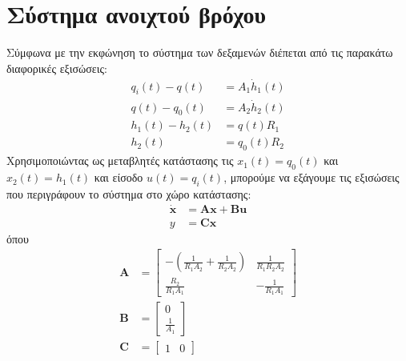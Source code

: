 \documentclass[a4paper, 11pt, english, greek]{article}
\begin{document}
\section{Σύστημα ανοιχτού βρόχου}
Σύμφωνα με την εκφώνηση το σύστημα των δεξαμενών διέπεται από τις παρακάτω διαφορικές εξισώσεις:
\begin{equation}
  \begin{split}
  	\label{eq:dif}
	q_i(t)-q(t) &= A_1 \dot{h}_1(t)\\
	q(t)-q_0(t) &= A_2 \dot{h}_2(t)\\
	h_1(t) - h_2(t) &= q(t) R_1\\
	h_2(t) &= q_0(t) R_2
  \end{split}
\end{equation}
Χρησιμοποιώντας ως μεταβλητές κατάστασης τις $x_1(t)=q_0(t)$ και $x_2(t)=h_1(t)$ και είσοδο $u(t) = q_i(t)$,
μπορούμε να εξάγουμε τις εξισώσεις που περιγράφουν το σύστημα στο χώρο κατάστασης:
\begin{equation}
  \begin{split}
  	\label{eq:ss}
  	\dot{\mathbf{x}} &= \mathbf{A}\mathbf{x} + \mathbf{B}\mathbf{u}\\
    y &= \mathbf{C}\mathbf{x}
  \end{split}
\end{equation}
όπου
\begin{equation}
  \label{eq:mat}
  \begin{split}
    \mathbf{A} &=
  	\begin{bmatrix}
      -(\frac{\displaystyle 1}{\displaystyle R_1 A_2} + \frac{\displaystyle 1}{\displaystyle R_2 A_2}) &
      \frac{\displaystyle 1}{\displaystyle R_1 R_2 A_2} \\
      \frac{\displaystyle R_2}{\displaystyle R_1 A_1} &
      -\frac{\displaystyle 1}{\displaystyle R_1 A_1}
    \end{bmatrix}\\
    \mathbf{B} &=
    \begin{bmatrix}
      0\\
      \frac{\displaystyle 1}{\displaystyle A_1}
    \end{bmatrix}\\
    \mathbf{C} &=
    \begin{bmatrix}
      1 & 0
    \end{bmatrix}
  \end{split}
\end{equation}

\end{document}
